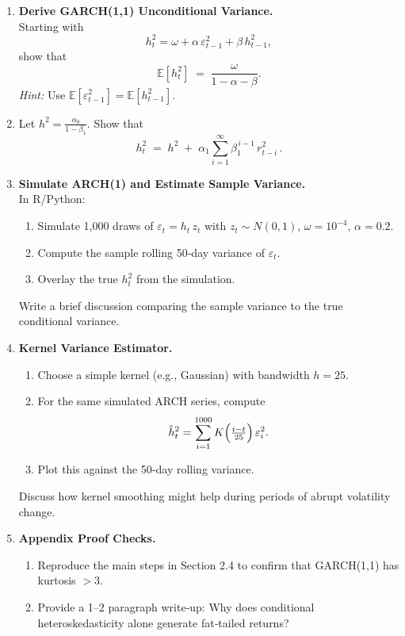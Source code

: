 \documentclass[11pt]{amsart}
\begin{document}
\begin{enumerate}[label=\arabic*.,noitemsep,left=0pt]
	\item \textbf{Derive GARCH(1,1) Unconditional Variance.}\\
	      Starting with
	      \[
		      h_t^2 = \omega + \alpha\,\varepsilon_{t-1}^2 + \beta\,h_{t-1}^2,
	      \]
	      show that
	      \[
		      \mathbb{E}[h_t^2] \;=\; \frac{\omega}{1 - \alpha - \beta}.
	      \]
	      \textit{Hint:} Use $\mathbb{E}[\varepsilon_{t-1}^2] = \mathbb{E}[h_{t-1}^2]$.

	\item Let \(h^2 = \frac{\alpha_0}{1 - \beta_1}\). Show that
	      \[
		      h_t^2 \;=\; h^2 \;+\; \alpha_1 \sum_{i=1}^\infty \beta_1^{\,i-1}\,r_{t-i}^2 \, .
	      \]


	\item \textbf{Simulate ARCH(1) and Estimate Sample Variance.}\\
	      In R/Python:
	      \begin{enumerate}[noitemsep,left=1em]
		      \item Simulate 1{,}000 draws of $\varepsilon_t = h_t\,z_t$ with $z_t \sim N(0,1)$, $\omega=10^{-4}$, $\alpha=0.2$.
		      \item Compute the sample rolling 50‐day variance of $\varepsilon_t$.
		      \item Overlay the true $h_t^2$ from the simulation.
	      \end{enumerate}
	      Write a brief discussion comparing the sample variance to the true conditional variance.

	\item \textbf{Kernel Variance Estimator.}\\
	      \begin{enumerate}[noitemsep,left=1em]
		      \item Choose a simple kernel (e.g., Gaussian) with bandwidth $h=25$.
		      \item For the same simulated ARCH series, compute
		            \[
			            \hat h_t^2 = \sum_{i=1}^{1000} K\Bigl(\tfrac{i - t}{25}\Bigr)\,\varepsilon_i^2.
		            \]
		      \item Plot this against the 50‐day rolling variance.
	      \end{enumerate}
	      Discuss how kernel smoothing might help during periods of abrupt volatility change.

	\item \textbf{Appendix Proof Checks.}\\
	      \begin{enumerate}[noitemsep,left=1em]
		      \item Reproduce the main steps in Section 2.4 to confirm that GARCH(1,1) has kurtosis $>3$.
		      \item Provide a 1–2 paragraph write‐up: Why does conditional heteroskedasticity alone generate fat‐tailed returns?
	      \end{enumerate}


\end{enumerate}
\end{document}
